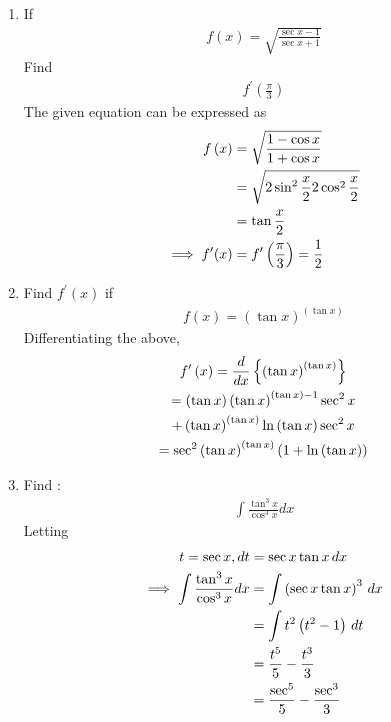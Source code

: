 \documentclass[journal,12pt,twocolumn]{IEEEtran}
\renewcommand\thesection{\arabic{section}}
\begin{document}
\begin{enumerate}[label=\thesection.\arabic*.,ref=\thesection.\theenumi]
\item If 
	\begin{align} 
		f\left(x\right)= \sqrt{\frac{\sec x-1}{\sec x+1}}\nonumber 
		\end{align} 
		Find 
		\begin{align} 
			f^{\prime}\left(\frac{\pi}{3}\right) \nonumber 
		\end{align}
		\solution The given equation can be expressed as
	\begin{align} 
		f\left(x\right)&= \sqrt{\frac{1-\cos x}{1+\cos x}}
		\\
		&=\sqrt{2 \sin^2{\frac{x}{2}}{2\cos^2 \frac{x}{2}}}
		\\
		&= \tan \frac{x}{2}
		\\
		\implies 
			f^{\prime}(x) &= f^{\prime}\left(\frac{\pi}{3}\right)= \frac{1}{2}
		\end{align} 

\item Find $f^{\prime}\left(x\right)$ if 
	\begin{align} 
	f\left(x\right)=\left(\tan x\right)^{\left(\tan x\right)} 
	\end{align}
	\solution Differentiating the above, 
	\begin{multline} 
		f^{\prime}\left(x\right)=\frac{d}{dx}\left\{\left(\tan x\right)^{\left(\tan x\right)} \right\}
		\\
		=\left(\tan x\right)\left(\tan x\right)^{\left(\tan x\right)-1}\sec^2 x
		\\
		+ \left(\tan x\right)^{\left(\tan x\right)} \ln \left(\tan x\right)\sec^2 x
		\\
		= \sec^2\left(\tan x\right)^{\left(\tan x\right)}\left(1 +\ln \left(\tan x\right) \right)
	\end{multline}

\item Find :
	\begin{align}
		\int \frac{\tan^3x}{\cos^3x} dx 
	\end{align} 
\solution Letting 
	\begin{align}
		t = \sec x, dt &= \sec x \tan x \, dx
		\\
\implies 		\int \frac{\tan^3x}{\cos^3x} dx &= 
		\int \left(\sec x \tan x\right)^3 \, dx
		\\
		&= \int t^2\left(t^2-1\right)\, dt
		\\
		&= \frac{t^5}{5} - \frac{t^3}{3}
		\\
		&= \frac{\sec^5}{5} - \frac{\sec^3}{3}
	\end{align} 




\end{enumerate}
\end{document}
